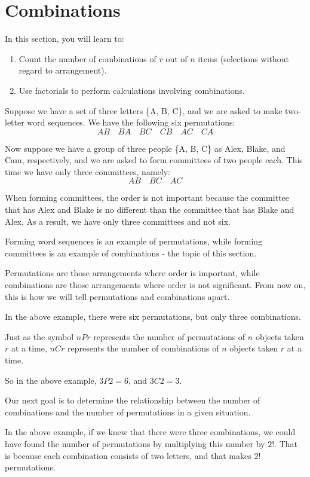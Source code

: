 \section{Combinations}

In this section, you will learn to:
\begin{enumerate}
    \item Count the number of combinations of \( r \) out of \( n \) items (selections without regard to arrangement).
    \item Use factorials to perform calculations involving combinations.
\end{enumerate}

Suppose we have a set of three letters \{A, B, C\}, and we are asked to make two-letter word sequences. We have the following six permutations:
\[ AB \quad BA \quad BC \quad CB \quad AC \quad CA \]

Now suppose we have a group of three people \{A, B, C\} as Alex, Blake, and Cam, respectively, and we are asked to form committees of two people each. This time we have only three committees, namely:
\[ AB \quad BC \quad AC \]

When forming committees, the order is not important because the committee that has Alex and Blake is no different than the committee that has Blake and Alex. As a result, we have only three committees and not six.

Forming word sequences is an example of permutations, while forming committees is an example of combinations - the topic of this section.

Permutations are those arrangements where order is important, while combinations are those arrangements where order is not significant. From now on, this is how we will tell permutations and combinations apart.

In the above example, there were six permutations, but only three combinations.

Just as the symbol \( nPr \) represents the number of permutations of \( n \) objects taken \( r \) at a time, \( nCr \) represents the number of combinations of \( n \) objects taken \( r \) at a time.

So in the above example, \( 3P2 = 6 \), and \( 3C2 = 3 \).

Our next goal is to determine the relationship between the number of combinations and the number of permutations in a given situation.

In the above example, if we knew that there were three combinations, we could have found the number of permutations by multiplying this number by \( 2! \). That is because each combination consists of two letters, and that makes \( 2! \) permutations.

